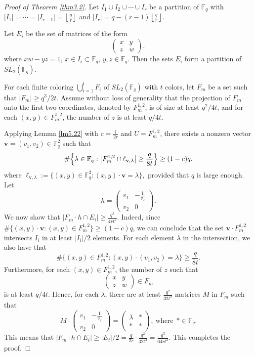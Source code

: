 \documentclass[11pt]{article}
\theoremstyle{definition}
\begin{document}
\begin{proof}[Proof of Theorem \ref{thm3.2}]
Let $I_1\cup I_2\cup \cdots \cup I_r$ be a partition of $\mathbb{F}_q$ with $|I_1|=\cdots=|I_{r-1}|=\left\lfloor\frac{q}{r}\right\rfloor$ and $|I_r|=q-(r-1)\left\lfloor\frac{q}{r}\right\rfloor$.

    Let $E_i$ be the set of matrices of the form 
\[\begin{pmatrix}
    x&y\\
    z&w
\end{pmatrix},\]
where $xw-yz=1$, $x\in I_i\subset \mathbb{F}_q$, $y, z\in \mathbb{F}_q$. Then the sets $E_i$ form a partition of $SL_2(\mathbb{F}_q)$. 

For each finite coloring $\bigcup_{i=1}^t F_i$ of $SL_2(\mathbb{F}_q)$ with $t$ colors, let $F_m$ be a set such that $|F_m|\ge q^3/2t$. Assume without loss of generality that the projection of $F_m$ onto the first two coordinates, denoted by $F_m^{1, 2}$, is of size at least $q^2/4t$, and for each $(x, y)\in F_m^{1, 2}$, the number of $z$ is at least $q/4t$.

Applying Lemma \ref{lm5.22} with $c=\frac{1}{2r}$ and $U=F_m^{1,2}$, there exists a nonzero vector $\mathbf{v}=(v_1, v_2)\in\mathbb{F}_{q}^{2}$ such that
\[
\#\Bigl\{\lambda\in\mathbb{F}_{q}:
        \bigl|F_m^{1,2}\cap\ell_{\mathbf{v},\lambda}\bigr|
          \ge\frac{q}{8t}\Bigr\}
     \ge(1-c)q,
\]
where
$
\ell_{\mathbf{v},\lambda}:=\{(x,y)\in\mathbb{F}_{q}^{2}:(x,y)\cdot \mathbf{v}=\lambda\},
$ provided that $q$ is large enough. Let 
\[h=\begin{pmatrix}
    v_1&-\frac{1}{v_2}\\
    v_2&0
\end{pmatrix}.\]
We now show that $|F_m\cdot h\cap E_i|\ge \frac{q^3}{4rt^2}$.
Indeed, since $\#\{(x, y)\cdot \mathbf{v}\colon (x, y)\in F_m^{1, 2}\}\ge (1-c)q$, we can conclude that the set $\mathbf{v}\cdot F_m^{1,2}$ intersects $I_i$ in at least $|I_i|/2$ elements. For each element $\lambda$ in the intersection, we also have that 
\[\#\{(x, y)\in F_m^{1, 2}\colon (x, y)\cdot (v_1, v_2)=\lambda \}\ge \frac{q}{8t}.\]
Furthermore, for each $(x, y)\in F_m^{1,2}$, the number of $z$ such that 
\[\begin{pmatrix}
    x&y\\
    z&w
\end{pmatrix}\in F_m\]
is at least $q/4t$. Hence, for each $\lambda$, there are at least $\frac{q^2}{32t^2}$ matrices $M$ in $F_m$ such that 
\[M\cdot \begin{pmatrix}
    v_1&-\frac{1}{v_2}\\
    v_2&0
\end{pmatrix}=\begin{pmatrix}
    \lambda&*\\
    *&*
\end{pmatrix},~\mbox{where}~~ *\in \mathbb{F}_q.\]
This means that $|F_m\cdot h\cap E_i|\ge |E_i|/2=\frac{q}{2r}\cdot \frac{q^2}{32t^2}=\frac{q^3}{64rt^2}$. 
This completes the proof.
\end{proof}
\end{document}
